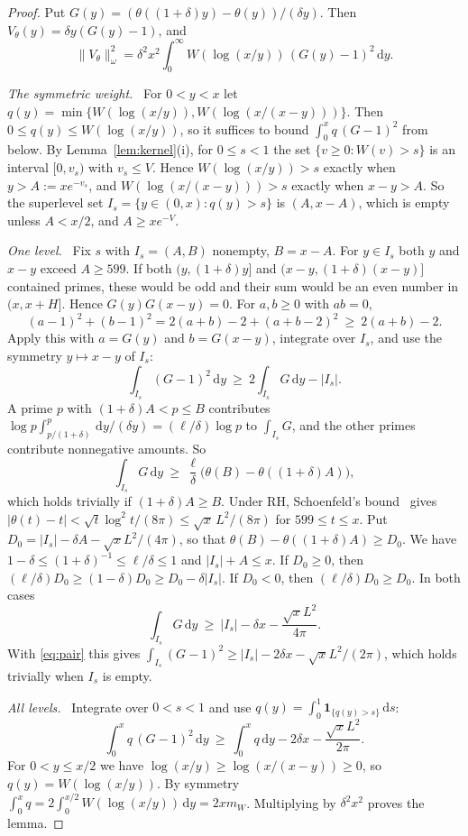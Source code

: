\documentclass[11pt]{amsart}
\theoremstyle{remark}
\newcommand{\dd}{\,\mathrm{d}}
\newcommand{\step}[1]{\smallskip\noindent\textit{#1.}\ }
\begin{document}
\begin{proof}
Put $G(y)=(\theta((1+\delta)y)-\theta(y))/(\delta y)$. Then $V_\theta(y)=\delta y(G(y)-1)$, and
\[
\|V_\theta\|_\omega^2=\delta^2x^2\int_0^\infty W(\log(x/y))\,(G(y)-1)^2\dd y .
\]

\step{The symmetric weight} For $0<y<x$ let $q(y)=\min\{W(\log(x/y)),W(\log(x/(x-y)))\}$. Then $0\le q(y)\le W(\log(x/y))$, so it suffices to bound $\int_0^xq\,(G-1)^2$ from below. By Lemma~\ref{lem:kernel}(i), for $0\le s<1$ the set $\{v\ge0:W(v)>s\}$ is an interval $[0,v_s)$ with $v_s\le V$. Hence $W(\log(x/y))>s$ exactly when $y>A:=xe^{-v_s}$, and $W(\log(x/(x-y)))>s$ exactly when $x-y>A$. So the superlevel set $I_s=\{y\in(0,x):q(y)>s\}$ is $(A,x-A)$, which is empty unless $A<x/2$, and $A\ge xe^{-V}$.

\step{One level} Fix $s$ with $I_s=(A,B)$ nonempty, $B=x-A$. For $y\in I_s$ both $y$ and $x-y$ exceed $A\ge599$. If both $(y,(1+\delta)y]$ and $(x-y,(1+\delta)(x-y)]$ contained primes, these would be odd and their sum would be an even number in $(x,x+H]$. Hence $G(y)G(x-y)=0$. For $a,b\ge0$ with $ab=0$,
\[
(a-1)^2+(b-1)^2=2(a+b)-2+(a+b-2)^2\ \ge\ 2(a+b)-2 .
\]
Apply this with $a=G(y)$ and $b=G(x-y)$, integrate over $I_s$, and use the symmetry $y\mapsto x-y$ of $I_s$:
\begin{equation}\label{eq:pair}\tag{P}
\int_{I_s}(G-1)^2\dd y\ \ge\ 2\int_{I_s}G\dd y-|I_s| .
\end{equation}
A prime $p$ with $(1+\delta)A<p\le B$ contributes $\log p\int_{p/(1+\delta)}^{p}\dd y/(\delta y)=(\ell/\delta)\log p$ to $\int_{I_s}G$, and the other primes contribute nonnegative amounts. So
\[
\int_{I_s}G\dd y\ \ge\ \frac\ell\delta\big(\theta(B)-\theta((1+\delta)A)\big),
\]
which holds trivially if $(1+\delta)A\ge B$. Under RH, Schoenfeld's bound~\cite[Thm.~10, (6.3)]{Schoenfeld} gives $|\theta(t)-t|<\sqrt t\log^2t/(8\pi)\le\sqrt x\,L^2/(8\pi)$ for $599\le t\le x$. Put $D_0=|I_s|-\delta A-\sqrt xL^2/(4\pi)$, so that $\theta(B)-\theta((1+\delta)A)\ge D_0$. We have $1-\delta\le(1+\delta)^{-1}\le\ell/\delta\le1$ and $|I_s|+A\le x$. If $D_0\ge0$, then $(\ell/\delta)D_0\ge(1-\delta)D_0\ge D_0-\delta|I_s|$. If $D_0<0$, then $(\ell/\delta)D_0\ge D_0$. In both cases
\[
\int_{I_s}G\dd y\ \ge\ |I_s|-\delta x-\frac{\sqrt xL^2}{4\pi}.
\]
With \eqref{eq:pair} this gives $\int_{I_s}(G-1)^2\ge|I_s|-2\delta x-\sqrt xL^2/(2\pi)$, which holds trivially when $I_s$ is empty.

\step{All levels} Integrate over $0<s<1$ and use $q(y)=\int_0^1\mathbf 1_{\{q(y)>s\}}\dd s$:
\[
\int_0^xq\,(G-1)^2\dd y\ \ge\ \int_0^xq\dd y-2\delta x-\frac{\sqrt xL^2}{2\pi}.
\]
For $0<y\le x/2$ we have $\log(x/y)\ge\log(x/(x-y))\ge0$, so $q(y)=W(\log(x/y))$. By symmetry $\int_0^xq=2\int_0^{x/2}W(\log(x/y))\dd y=2xm_W$. Multiplying by $\delta^2x^2$ proves the lemma.
\end{proof}
\end{document}
